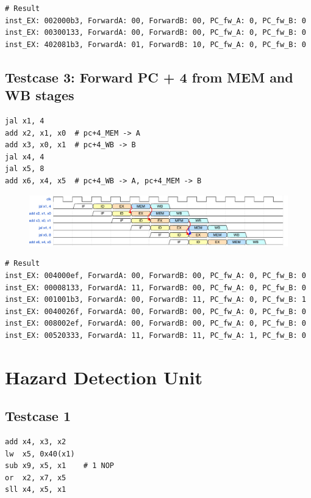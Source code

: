 \documentclass[12pt,a4paper,oneside]{book} %
\begin{document}
\begin{verbatim}
# Result
inst_EX: 002000b3, ForwardA: 00, ForwardB: 00, PC_fw_A: 0, PC_fw_B: 0
inst_EX: 00300133, ForwardA: 00, ForwardB: 00, PC_fw_A: 0, PC_fw_B: 0
inst_EX: 402081b3, ForwardA: 01, ForwardB: 10, PC_fw_A: 0, PC_fw_B: 0
\end{verbatim}

\subsection{Testcase 3: Forward PC + 4 from MEM and WB stages}
\begin{verbatim}
jal x1, 4
add x2, x1, x0  # pc+4_MEM -> A
add x3, x0, x1  # pc+4_WB -> B
jal x4, 4
jal x5, 8
add x6, x4, x5  # pc+4_WB -> A, pc+4_MEM -> B
\end{verbatim}

\begin{figure}[H]
    \centering
    \includegraphics[scale=0.58]{images/tb/fw_case3.pdf}
\end{figure}

\begin{verbatim}
# Result
inst_EX: 004000ef, ForwardA: 00, ForwardB: 00, PC_fw_A: 0, PC_fw_B: 0
inst_EX: 00008133, ForwardA: 11, ForwardB: 00, PC_fw_A: 0, PC_fw_B: 0
inst_EX: 001001b3, ForwardA: 00, ForwardB: 11, PC_fw_A: 0, PC_fw_B: 1
inst_EX: 0040026f, ForwardA: 00, ForwardB: 00, PC_fw_A: 0, PC_fw_B: 0
inst_EX: 008002ef, ForwardA: 00, ForwardB: 00, PC_fw_A: 0, PC_fw_B: 0
inst_EX: 00520333, ForwardA: 11, ForwardB: 11, PC_fw_A: 1, PC_fw_B: 0
\end{verbatim}

\section{Hazard Detection Unit}
\subsection{Testcase 1}
\begin{verbatim}
add x4, x3, x2
lw  x5, 0x40(x1)
sub x9, x5, x1    # 1 NOP
or  x2, x7, x5
sll x4, x5, x1
\end{verbatim}
\end{document}
